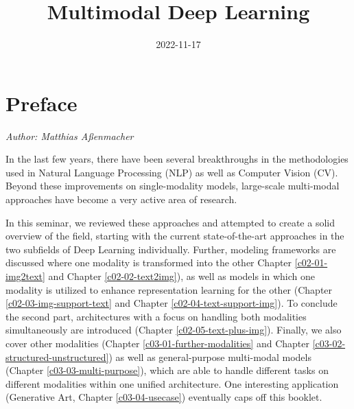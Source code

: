 \documentclass[
]{krantz}
\title{Multimodal Deep Learning}
\author{}
\date{\vspace{-2.5em}2022-11-17}
\begin{document}
\maketitle


\thispagestyle{empty}

\begin{center}
\end{center}

\setlength{\abovedisplayskip}{-5pt}
\setlength{\abovedisplayshortskip}{-5pt}

{
\hypersetup{linkcolor=}
\setcounter{tocdepth}{1}
\tableofcontents
}
\hypertarget{preface}{%
\chapter*{Preface}\label{preface}}


\emph{Author: Matthias Aßenmacher}

In the last few years, there have been several breakthroughs in the methodologies used in Natural Language Processing (NLP) as well as Computer Vision (CV). Beyond these improvements on single-modality models, large-scale multi-modal approaches have become a very active area of research.

In this seminar, we reviewed these approaches and attempted to create a solid overview of the field, starting with the current state-of-the-art approaches in the two subfields of Deep Learning individually. Further, modeling frameworks are discussed where one modality is transformed into the other Chapter \ref{c02-01-img2text} and Chapter \ref{c02-02-text2img}), as well as models in which one modality is utilized to enhance representation learning for the other (Chapter \ref{c02-03-img-support-text} and Chapter \ref{c02-04-text-support-img}). To conclude the second part, architectures with a focus on handling both modalities simultaneously are introduced (Chapter \ref{c02-05-text-plus-img}). Finally, we also cover other modalities (Chapter \ref{c03-01-further-modalities} and Chapter \ref{c03-02-structured-unstructured}) as well as general-purpose multi-modal models (Chapter \ref{c03-03-multi-purpose}), which are able to handle different tasks on different modalities within one unified architecture. One interesting application (Generative Art, Chapter \ref{c03-04-usecase}) eventually caps off this booklet.
\end{document}
